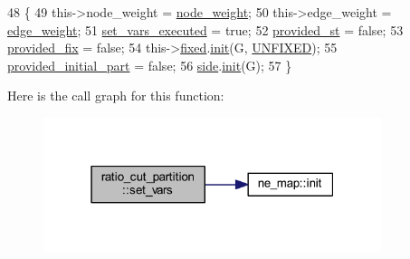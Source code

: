 \begin{DoxyCode}
48 \{
49     this->node\_weight = \mbox{\hyperlink{classratio__cut__partition_a4d9d2a9317a062f839ea7155c37b173f}{node\_weight}};
50     this->edge\_weight = \mbox{\hyperlink{classratio__cut__partition_a48a85c82fb09b83c9d494d6d1232fab2}{edge\_weight}};
51     \mbox{\hyperlink{classratio__cut__partition_aa722d032cb59664894c6301ceee86729}{set\_vars\_executed}} = \textcolor{keyword}{true};
52     \mbox{\hyperlink{classratio__cut__partition_a248512624766f0b21d154b4841c95a1d}{provided\_st}} = \textcolor{keyword}{false};
53     \mbox{\hyperlink{classratio__cut__partition_a5f1f85feae589f7d39da48a412c90376}{provided\_fix}} = \textcolor{keyword}{false};
54     this->\mbox{\hyperlink{classratio__cut__partition_ad77023b9f60e88274bf54f2019404768}{fixed}}.\mbox{\hyperlink{classne__map_a4ef2ab4aebcb57a7a101975bf6a88e24}{init}}(G, \mbox{\hyperlink{classratio__cut__partition_a153cc7e51ac5d72a00671b6bdbcc6fa5}{UNFIXED}});
55     \mbox{\hyperlink{classratio__cut__partition_a963258b950f7142e3cac714353b1b21e}{provided\_initial\_part}} = \textcolor{keyword}{false};
56     \mbox{\hyperlink{classratio__cut__partition_a2bf913d1d8607747885177a3b585e611}{side}}.\mbox{\hyperlink{classne__map_a4ef2ab4aebcb57a7a101975bf6a88e24}{init}}(G);
57 \}
\end{DoxyCode}
Here is the call graph for this function\+:\nopagebreak
\begin{figure}[H]
\begin{center}
\leavevmode
\includegraphics[width=280pt]{classratio__cut__partition_a4c143f82aac5fee3b955414ab7d6ce19_cgraph}
\end{center}
\end{figure}
\mbox{\label{classratio__cut__partition_aacd519cdb1760af792e22d57e746c07f}} 
